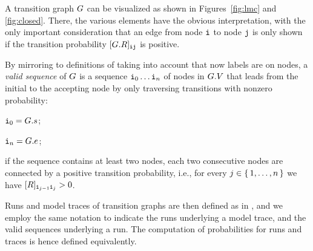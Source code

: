A transition graph $G$ can be visualized as shown in Figures~\eqref{fig:lmc} and \eqref{fig:closed}. There, the various elements have the obvious interpretation, with the only important consideration that an edge from node $\textnormal{\texttt{i}}$ to node $\textnormal{\texttt{j}}$ is only shown if the transition probability $[G.R]_{\textnormal{\texttt{i}}\textnormal{\texttt{j}}}$ is positive.

%


By mirroring to definitions of  taking into account that now labels are on nodes, a \emph{valid sequence} of $G$ is a sequence $\textnormal{\texttt{i}}_0\ldots\textnormal{\texttt{i}}_n$ of nodes in $G.V$ that leads from the initial to the accepting node by only traversing transitions with nonzero probability:
\begin{inparaenum}[\it (i)]
\item $\textnormal{\texttt{i}}_0 = G.s$;
\item $\textnormal{\texttt{i}}_n = G.e$;
\item if the sequence contains at least two nodes, each two consecutive nodes are connected by a positive transition probability, i.e., for every $j \in \set{1,\ldots,n}$ we have $[R]_{\textnormal{\texttt{i}}_{j-1}\textnormal{\texttt{i}}_{j}} > 0$.
\end{inparaenum}
Runs and model traces of transition graphs are then defined as in , and we employ the same notation to indicate the runs underlying a model trace, and the valid sequences underlying a run. The computation of probabilities for runs and traces is hence defined equivalently.

